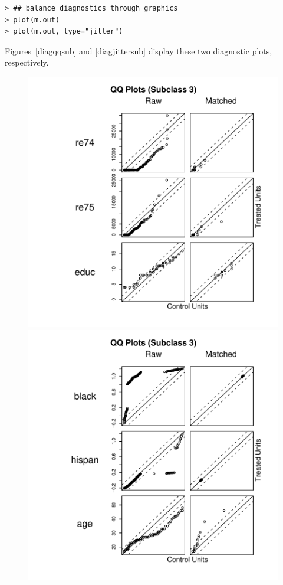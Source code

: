 \documentclass[oneside,letterpaper,titlepage]{article}
\begin{document}
\begin{enumerate}
\begin{verbatim}
> ## balance diagnostics through graphics
> plot(m.out)
> plot(m.out, type="jitter")
\end{verbatim}    
Figures~\ref{diagqqsub} and \ref{diagjittersub} display these two
diagnostic plots, respectively.
\begin{figure}[tbp]
  \begin{center}
    \includegraphics[scale=.5]{figs/qqplotsub}
    \includegraphics[scale=.5]{figs/qqplotsub2}

\end{center}
\end{figure}
\end{enumerate}
\end{document}

